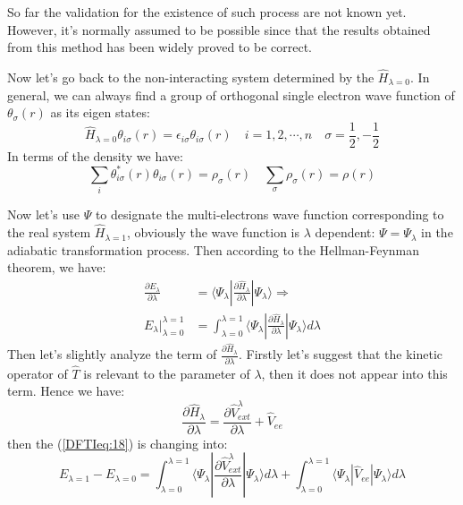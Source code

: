 So far the validation for the existence of such process are not
known yet\cite{PhysRevA.29.1648, 2004PhST..109....9V}. However, it's
normally assumed to be possible since that the results obtained from
this method has been widely proved to be
correct\cite{2004PhST..109....9V}.

Now let's go back to the non-interacting system determined by the
$\hat{H}_{\lambda = 0}$. In general, we can always find a group of
orthogonal single electron wave function of $\theta_{\sigma}(r)$ as
its eigen states:
\begin{equation}\label{}
  \hat{H}_{\lambda = 0} \theta_{i\sigma}(r) =
  \epsilon_{i\sigma}\theta_{i\sigma}(r) \quad i=1, 2, \cdots, n
  \quad \sigma = \frac{1}{2}, -\frac{1}{2}
\end{equation}
In terms of the density we have:
\begin{equation}\label{}
\sum_{i}\theta_{i\sigma}^{*}(r)\theta_{i\sigma}(r) =
\rho_{\sigma}(r) \quad  \sum_{\sigma}\rho_{\sigma}(r) = \rho(r)
\end{equation}

Now let's use $\Psi$ to designate the multi-electrons wave function
corresponding to the real system $\hat{H}_{\lambda = 1}$, obviously
the wave function is $\lambda$ dependent: $\Psi = \Psi_{\lambda}$ in
the adiabatic transformation process. Then according to the
Hellman-Feynman theorem, we have:
\begin{equation}\label{DFTIeq:18}
\begin{split}
  \frac{\partial E_{\lambda}}{\partial \lambda} &=
\langle\Psi_{\lambda}|\frac{\partial \hat{H}_{\lambda}}{\partial
\lambda}
|\Psi_{\lambda}\rangle \Rightarrow \\
E_{\lambda} \Big|^{\lambda = 1}_{\lambda = 0} &= \int^{\lambda =
1}_{\lambda = 0}\langle\Psi_{\lambda}|\frac{\partial
\hat{H}_{\lambda}}{\partial \lambda} |\Psi_{\lambda}\rangle d\lambda
\end{split}
\end{equation}
Then let's slightly analyze the term of $\frac{\partial
\hat{H}_{\lambda}}{\partial \lambda}$. Firstly let's suggest that
the kinetic operator of $\hat{T}$ is relevant to the parameter of
$\lambda$, then it does not appear into this term. Hence we have:
\begin{equation}\label{}
\frac{\partial \hat{H}_{\lambda}}{\partial \lambda} = \frac{\partial
\hat{V}^{\lambda}_{ext}}{\partial \lambda} + \hat{V}_{ee}
\end{equation}
then the (\ref{DFTIeq:18}) is changing into:
\begin{equation}\label{DFTIeq:19}
E_{\lambda = 1} - E_{\lambda = 0} = \int^{\lambda = 1}_{\lambda =
0}\langle\Psi_{\lambda}|\frac{\partial
\hat{V}^{\lambda}_{ext}}{\partial \lambda} |\Psi_{\lambda}\rangle
d\lambda + \int^{\lambda = 1}_{\lambda =
0}\langle\Psi_{\lambda}|\hat{V}_{ee} |\Psi_{\lambda}\rangle d\lambda
\end{equation}

